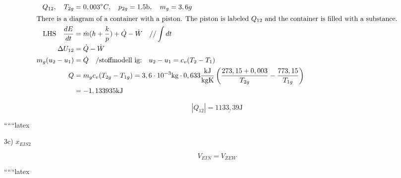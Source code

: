 \begin{align*}
    Q_{12}, \quad T_{2g} &= 0,003^\circ C, \quad p_{2g} = 1.5 \text{b}, \quad m_g = 3,6g \\
    \intertext{There is a diagram of a container with a piston. The piston is labeled \(Q_{12}\) and the container is filled with a substance.}
    \text{LHS} \quad \frac{dE}{dt} &= \dot{m}(h + \frac{k}{p}) + \dot{Q} - \dot{W} \quad // \int dt \\
    \Delta U_{12} &= \dot{Q} - \dot{W} \\
    m_g (u_2 - u_1) &= \dot{Q} \quad / \text{stoffmodell ig:} \quad u_2 - u_1 = c_v (T_2 - T_1) \\
    Q &= m_g c_v (T_{2g} - T_{1g}) = 3,6 \cdot 10^{-3} \text{kg} \cdot 0,633 \frac{\text{kJ}}{\text{kgK}} \left( \frac{273,15 + 0,003}{T_{2g}} - \frac{773,15}{T_{1g}} \right) \\
    &= -1,133935 \text{kJ}
\end{align*}

\[
|Q_{12}| = \underline{1133,39 \text{J}}
\]

``````latex


3c) \( x_{EIS2} \)

\[ V_{EIN} = V_{ZEW} \]

``````latex


